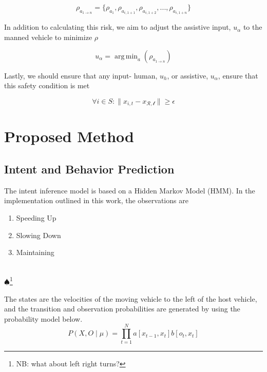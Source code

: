 \documentclass[conference]{IEEEtran}
\DeclareMathOperator*{\argmin}{arg\,min}
\newcommand\NB[1]{$\spadesuit$\footnote{NB: #1}}
\begin{document}
	\begin{equation}
	    \rho_{a_{1\rightarrow n}} = \{\rho_{a_{1}}, \rho_{a_{i,1+1}}, \rho_{a_{i,1+2}}, ..., \rho_{a_{i,1+n}}\}
	\end{equation}
	
	In addition to calculating this risk, we aim to adjust the assistive input, $u_{\alpha}$ to the manned vehicle to minimize $\rho$
	
	\begin{equation}
    	    u_{\alpha} = \argmin_{a}(\rho_{a_{1\rightarrow n}})
	\end{equation}
	
	Lastly, we should ensure that any input- human, $u_{h}$, or assistive, $u_{\alpha}$, ensure that this safety condition is met
	
	\begin{equation}
	    \forall i\in S: \lVert x_{i,t}-x_{\mathcal{R,t}}\rVert \geq \epsilon
	\end{equation}
	
\section{Proposed Method}
\subsection{Intent and Behavior Prediction}
The intent inference model is based on a Hidden Markov Model (HMM). In the implementation outlined in this work, the observations are\\

\begin{varwidth}{\textwidth}
\begin{enumerate}
  \item Speeding Up
  \item Slowing Down
  \item Maintaining
\end{enumerate}
\end{varwidth}\\
\NB{what about left right turns?}

The states are the velocities of the moving vehicle to the left of the host vehicle, and the transition and observation probabilities are generated by using the probability model below.
\begin{equation}
P(X, O \mid \mu) = \prod_{t=1}^{N} a[x_{t-1},x_{t}]b[o_{t},x_{t}]
\end{equation}
\end{document}
